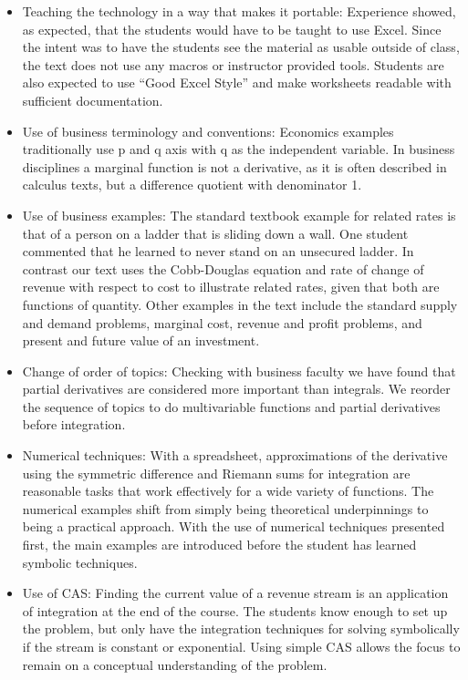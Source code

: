 \documentclass[10pt,]{book}
\theoremstyle{plain}
\theoremstyle{definition}
\theoremstyle{definition}
\begin{document}
\begin{itemize}[label=\textbullet]
\item{}Teaching the technology in a way that makes it portable: Experience showed, as expected, that the students would have to be taught to use Excel. Since the intent was to have the students see the material as usable outside of class, the text does not use any macros or instructor provided tools. Students are also expected to use “Good Excel Style” and make worksheets readable with sufficient documentation. 
%
\item{} Use of business terminology and conventions: Economics examples traditionally use p and q axis with q as the independent variable. In business disciplines a marginal function is not a derivative, as it is often described in calculus texts, but a difference quotient with denominator 1. %
\item{} Use of business examples: The standard textbook example for related rates is that of a person on a ladder that is sliding down a wall. One student commented that he learned to never stand on an unsecured ladder. In contrast our text uses the Cobb-Douglas equation and rate of change of revenue with respect to cost to illustrate related rates, given that both are functions of quantity. Other examples in the text include the standard supply and demand problems, marginal cost, revenue and profit problems, and present and future value of an investment. 
%
\item{} Change of order of topics: Checking with business faculty we have found that partial derivatives are considered more important than integrals. We reorder the sequence of topics to do multivariable functions and partial derivatives before integration.
%
\item{} Numerical techniques: With a spreadsheet, approximations of the derivative using the symmetric difference and Riemann sums for integration are reasonable tasks that work effectively for a wide variety of functions. The numerical examples shift from simply being theoretical underpinnings to being a practical approach. With the use of numerical techniques presented first, the main examples are introduced before the student has learned symbolic techniques. 
%
\item{} Use of CAS: Finding the current value of a revenue stream is an application of integration at the end of the course. The students know enough to set up the problem, but only have the integration techniques for solving symbolically if the stream is constant or exponential. Using simple CAS allows the focus to remain on a conceptual understanding of the problem. 

\end{itemize}
\end{document}

